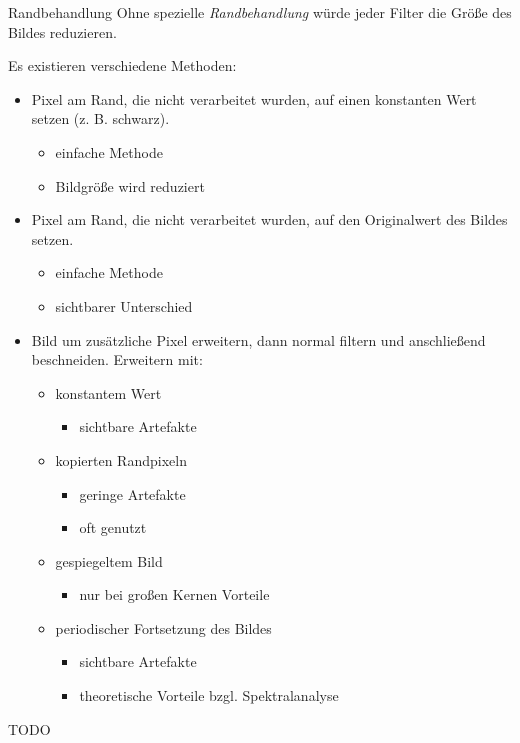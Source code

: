 \begin{defi}{Randbehandlung}
    Ohne spezielle \emph{Randbehandlung} würde jeder Filter die Größe des Bildes reduzieren.

    Es existieren verschiedene Methoden:
    \begin{itemize}
        \item Pixel am Rand, die nicht verarbeitet wurden, auf einen konstanten Wert setzen (z. B. schwarz).
              \begin{itemize}
                  \item einfache Methode
                  \item Bildgröße wird reduziert
              \end{itemize}
        \item Pixel am Rand, die nicht verarbeitet wurden, auf den Originalwert des Bildes setzen.
              \begin{itemize}
                  \item einfache Methode
                  \item sichtbarer Unterschied
              \end{itemize}
        \item Bild um zusätzliche Pixel erweitern, dann normal filtern und anschließend beschneiden.
              \subitem Erweitern mit:
              \begin{itemize}
                  \item konstantem Wert
                        \begin{itemize}
                            \item sichtbare Artefakte
                        \end{itemize}
                  \item kopierten Randpixeln
                        \begin{itemize}
                            \item geringe Artefakte
                            \item oft genutzt
                        \end{itemize}
                  \item gespiegeltem Bild
                        \begin{itemize}
                            \item nur bei großen Kernen Vorteile
                        \end{itemize}
                  \item periodischer Fortsetzung des Bildes
                        \begin{itemize}
                            \item sichtbare Artefakte
                            \item theoretische Vorteile bzgl. Spektralanalyse
                        \end{itemize}
              \end{itemize}
    \end{itemize}

    TODO
\end{defi}

